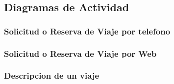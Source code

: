 \subsection{Diagramas de Actividad}

\subsubsection{Solicitud o Reserva de Viaje por telefono}
\subsubsection{Solicitud o Reserva de Viaje por Web}
\subsubsection{Descripcion de un viaje}
